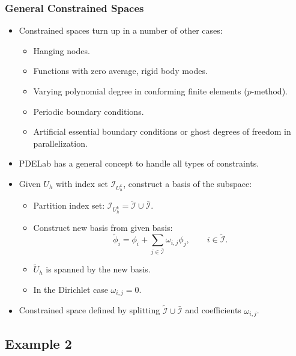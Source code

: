 \begin{frame}
\frametitle{General Constrained Spaces}
\begin{itemize}
\item Constrained spaces turn up in a number of other cases:
\begin{itemize}
\item Hanging nodes.
\item Functions with zero average, rigid body modes.
\item Varying polynomial degree in conforming finite elements ($p$-method).
\item Periodic boundary conditions.
\item Artificial essential boundary conditions or ghost degrees of freedom in parallelization.
\end{itemize}
\item PDELab has a general concept to handle all types of constraints.
\item Given $U_h$ with index set $\mathcal{I}_{U_h^k}$, construct a basis of the subspace:
\begin{itemize}
\item Partition index set: $\mathcal{I}_{U_h^k} = \tilde{\mathcal{I}} \cup \bar{\mathcal{I}}$.
\item Construct new basis from given basis:
\begin{equation*}
\tilde\phi_i = \phi_i + \sum\limits_{j\in\bar{\mathcal{I}}} \omega_{i,j} \phi_j, \qquad i\in\tilde{\mathcal{I}}.
\end{equation*}
\item $\tilde{U}_h$ is spanned by the new basis.
\item In the Dirichlet case $\omega_{i,j}=0$.
\end{itemize}
\item Constrained space defined by splitting $\tilde{\mathcal{I}} \cup \bar{\mathcal{I}}$
and coefficients $\omega_{i,j}$.
\end{itemize}
\end{frame}


\subsection{Example 2}

